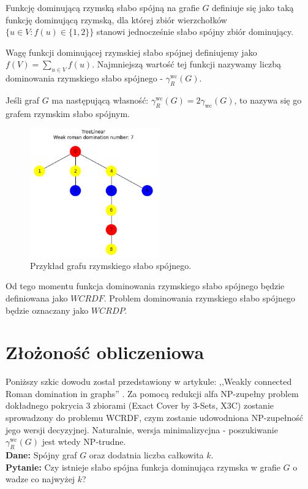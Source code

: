 \begin{definition}
    Funkcję dominującą rzymską słabo spójną na grafie $G$ definiuje się jako taką funkcję dominującą rzymską, dla której zbiór wierzchołków $\{u \in V: f(u) \in \{1,2\}\}$ stanowi jednocześnie słabo spójny zbiór dominujący.
\end{definition}

\begin{definition}
    Wagę funkcji dominującej rzymskiej słabo spójnej definiujemy jako $f(V) = \sum_{u \in V}{f(u)}$. Najmniejszą wartość tej funkcji nazywamy liczbą dominowania rzymskiego słabo spójnego - $\gamma_{R}^{\text{wc}}(G)$. 
\end{definition}

\begin{definition}
    Jeśli graf $G$ ma następującą własność: $\gamma_{R}^{\text{wc}}(G) = 2\gamma_{\text{wc}}(G)$, to nazywa się go grafem rzymskim słabo spójnym.
\end{definition}

\begin{figure}[H]
    \centering
    \includegraphics[width=0.5\textwidth]{assets/phase2.png}
    \caption{Przykład grafu rzymskiego słabo spójnego.}
    \label{fig:przykladWCRDF}
\end{figure}

Od tego momentu funkcja dominowania rzymskiego słabo spójnego będzie definiowana jako $WCRDF$. Problem dominowania rzymskiego słabo spójnego będzie oznaczany jako $WCRDP$.

\section{Złożoność obliczeniowa}
Poniższy szkic dowodu został przedstawiony w artykule: ,,Weakly connected Roman domination in graphs'' \cite{theoryWCRDF}. 
Za pomocą redukcji alfa NP-zupełny problem dokładnego pokrycia 3 zbiorami (Exact Cover by 3-Sets, X3C) \cite{X3C} zostanie sprowadzony do problemu WCRDF, czym zostanie udowodniona NP-zupełność jego wersji decyzyjnej. Naturalnie, wersja minimalizycjna - poszukiwanie $\gamma_{R}^{\text{wc}}(G)$ jest wtedy NP-trudne.\\
\textbf{Dane:} Spójny graf $G$ oraz dodatnia liczba całkowita $k$.\\
\textbf{Pytanie:} Czy istnieje słabo spójna funkcja dominująca rzymska w grafie $G$ o wadze co najwyżej $k$?\\

